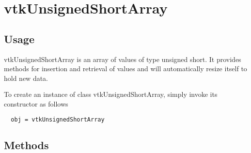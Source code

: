 \section{vtkUnsignedShortArray}

\subsection{Usage}

 vtkUnsignedShortArray is an array of values of type unsigned short.
 It provides methods for insertion and retrieval of values and will
 automatically resize itself to hold new data.

To create an instance of class vtkUnsignedShortArray, simply
invoke its constructor as follows
\begin{verbatim}
  obj = vtkUnsignedShortArray
\end{verbatim}
\subsection{Methods}

